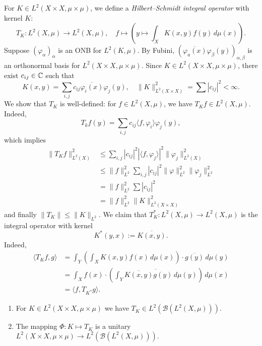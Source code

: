 For $K \in L^2 (X \times X, \mu \times \mu)$, we define a \emph{Hilbert--Schmidt integral operator} 
with kernel $K$:
$$T_K : L^2 (X, \mu) \to L^2 (X, \mu),\quad f \mapsto \left(y \mapsto \int_X K(x, y) f(y)\, d\mu (x)\right).$$
Suppose $(\varphi_\alpha)_{\alpha}$ is an ONB for $L^2 (K, \mu)$.
By Fubini, $\left(\overline{\varphi_a (x)} \varphi_\beta (y)\right)_{\alpha, \beta}$
is an orthonormal basis for $L^2 (X \times X, \mu \times \mu)$.
Since $K \in L^2 (X \times X, \mu \times \mu)$, there exist $c_{ij} \in \mathbb {C}$ such that 
$$K(x, y) = \sum_{i,j} c_{ij} \overline{\varphi_i (x)} \varphi_j (y),\quad \| K\|^2 _{L^2 (X \times X)} = \sum |c_{ij}|^2 < \infty.$$
We show that $T_K$ is well-defined: for $f \in L^2 (X, \mu)$, we have $T_K f \in L^2 (X,\mu)$.
Indeed,
$$T_k f (y) = \sum_{i, j} c_{ij} \langle f, \varphi_i \rangle \varphi_j (y),$$
which implies 
\begin{align*}
  \| T_K f\|_{L^2 (X)} ^2 &\leq \sum_{i, j} |c_{ij}|^2 |\langle f, \varphi_j\rangle|^2 \| \varphi_j\|^2 _{L^2 (X)}\\
  &\leq \| f\|_{L^2} ^2 \sum_{i, j} |c_{ij}|^2 \| \varphi\|^2 _{L^2} \| \varphi_j\|^2 _{L^2}\\
  &= \| f\|^2 _{L^2} \sum|c_{ij}|^2\\
  &= \| f\|^2 _{L^2} \|K\|^2 _{L^2 (X \times X)}
\end{align*}
and finally $\| T_K\| \leq \|K\|_{L^2}$.
We claim that $T_K ^* : L^2 (X, \mu) \to L^2 (X, \mu)$ is the integral operator with kernel 
$$K^* (y, x) := \overline{K(x, y)}.$$
Indeed, 
\begin{align*}
  \langle T_K f, g \rangle &= \int_Y \left(\int_X K(x, y) f(x) \, d\mu (x)\right) \cdot \overline{g(y)}\, d\mu (y)\\
  &= \int_X f(x) \cdot \left(\overline{\int_Y \overline{K(x, y)} g(y)\, d\mu(y)}\right)\, d\mu (x)\\ 
  &= \langle f, T_{K^*} g \rangle.
\end{align*}

\begin{theorem}
  \begin{enumerate}
    \item For $K \in L^2 (X \times X, \mu \times \mu)$ we have $T_K \in L^2 (\mathcal{B} (L^2 (X, \mu)))$.
    \item The mapping $\Phi: K \mapsto T_K$ is a unitary 
    $L^2 (X \times X, \mu \times \mu) \to L^2 (\mathcal{B} (L^2 (X, \mu))).$
  \end{enumerate}
\end{theorem}

